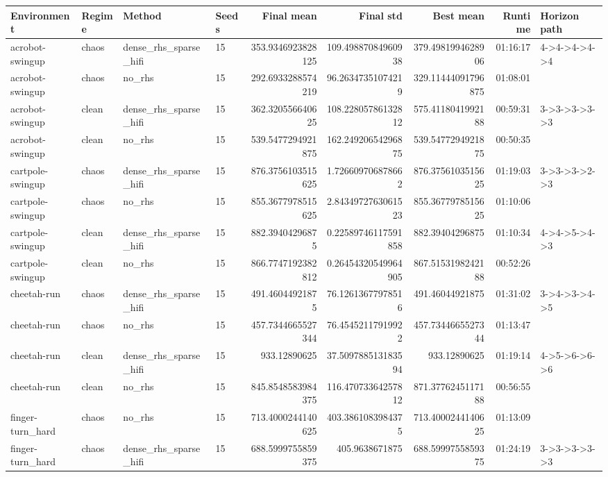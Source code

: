 \begin{tabular}{llllrrrrl}
\toprule
Environment & Regime & Method & Seeds & Final mean & Final std & Best mean & Runtime & Horizon path \\
\midrule
acrobot-swingup & chaos & dense\_rhs\_sparse\_hifi & 15 & 353.9346923828125 & 109.49887084960938 & 379.4981994628906 & 01:16:17 & 4->4->4->4->4 \\
acrobot-swingup & chaos & no\_rhs & 15 & 292.6933288574219 & 96.26347351074219 & 329.11444091796875 & 01:08:01 &  \\
acrobot-swingup & clean & dense\_rhs\_sparse\_hifi & 15 & 362.320556640625 & 108.22805786132812 & 575.4118041992188 & 00:59:31 & 3->3->3->3->3 \\
acrobot-swingup & clean & no\_rhs & 15 & 539.5477294921875 & 162.24920654296875 & 539.5477294921875 & 00:50:35 &  \\
cartpole-swingup & chaos & dense\_rhs\_sparse\_hifi & 15 & 876.3756103515625 & 1.726609706878662 & 876.3756103515625 & 01:19:03 & 3->3->3->2->3 \\
cartpole-swingup & chaos & no\_rhs & 15 & 855.3677978515625 & 2.8434972763061523 & 855.3677978515625 & 01:10:06 &  \\
cartpole-swingup & clean & dense\_rhs\_sparse\_hifi & 15 & 882.39404296875 & 0.22589746117591858 & 882.39404296875 & 01:10:34 & 4->4->5->4->3 \\
cartpole-swingup & clean & no\_rhs & 15 & 866.7747192382812 & 0.26454320549964905 & 867.5153198242188 & 00:52:26 &  \\
cheetah-run & chaos & dense\_rhs\_sparse\_hifi & 15 & 491.46044921875 & 76.12613677978516 & 491.46044921875 & 01:31:02 & 3->4->3->4->5 \\
cheetah-run & chaos & no\_rhs & 15 & 457.7344665527344 & 76.45452117919922 & 457.7344665527344 & 01:13:47 &  \\
cheetah-run & clean & dense\_rhs\_sparse\_hifi & 15 & 933.12890625 & 37.509788513183594 & 933.12890625 & 01:19:14 & 4->5->6->6->6 \\
cheetah-run & clean & no\_rhs & 15 & 845.8548583984375 & 116.47073364257812 & 871.3776245117188 & 00:56:55 &  \\
finger-turn\_hard & chaos & no\_rhs & 15 & 713.4000244140625 & 403.3861083984375 & 713.4000244140625 & 01:13:09 &  \\
finger-turn\_hard & chaos & dense\_rhs\_sparse\_hifi & 15 & 688.5999755859375 & 405.9638671875 & 688.5999755859375 & 01:24:19 & 3->3->3->3->3 \\

\end{tabular}
